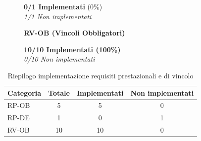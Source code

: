 \documentclass[a4paper, 11pt, oneside]{scrartcl}
\begin{document}
\begin{figure}[H]
\begin{minipage}{0.31\textwidth}
        
        \small
        \textbf{0/1 Implementati} (0\%)\\
        \textit{\textcolor{orange!90}{1/1 Non implementati}}
    \end{minipage}
    \hfill
    \begin{minipage}{0.31\textwidth}
        \centering
        \textbf{RV-OB (Vincoli Obbligatori)}
        \vspace{0.3cm}
        
        
        \small
        \textbf{\textcolor{blue!80}{10/10 Implementati} (100\%)}\\
        \textit{0/10 Non implementati}
    \end{minipage}
\end{figure}

\vspace{0.5cm}

\begin{table}[H]
    \centering
    \renewcommand{\arraystretch}{1.2}
    \begin{tabular}{@{}lccc@{}}
        \toprule
        \textbf{Categoria} & \textbf{Totale} & \textbf{Implementati} & \textbf{Non implementati} \\
        \midrule
        RP-OB & 5  & 5  & 0 \\
        RP-DE & 1  & 0  & 1 \\
        RV-OB & 10 & 10 & 0 \\
        \bottomrule
    \end{tabular}
    \caption{Riepilogo implementazione requisiti prestazionali e di vincolo}
    \label{tab:riepilogo_requisiti_non_funzionali}
\end{table}
\end{document}

